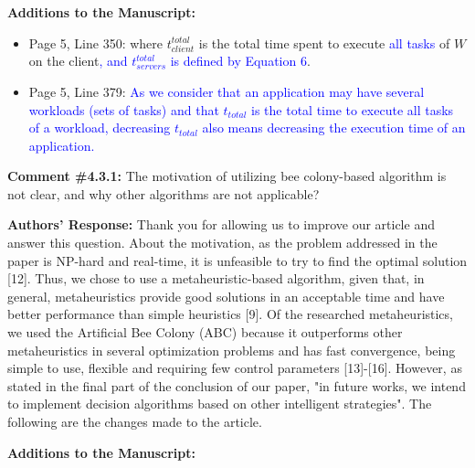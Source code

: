 \textbf{Additions to the Manuscript:}

\begin{itemize}
    \item Page 5, Line 350: where $t^{total}_{client}$ is the total time spent to execute \textcolor{blue}{all tasks} of $W$ on the client\textcolor{blue}{, and $t^{total}_{servers}$ is defined by Equation 6}.
    \item Page 5, Line 379: \textcolor{blue}{As we consider that an application may have several workloads (sets of tasks) and that $t_{total}$ is the total time to execute all tasks of a workload, decreasing $t_{total}$ also means decreasing the execution time of an application.}
\end{itemize}

\vspace{\baselineskip}

\begin{mdframed}[style=review] 
\textbf{Comment \#4.3.1:} The motivation of utilizing bee colony-based algorithm is not clear, and why other algorithms are not applicable?
\end{mdframed}

\textbf{Authors' Response:} Thank you for allowing us to improve our article and answer this question. About the motivation, as the problem addressed in the paper is NP-hard and real-time, it is unfeasible to try to find the optimal solution [12]. Thus, we chose to use a metaheuristic-based algorithm, given that, in general, metaheuristics provide good solutions in an acceptable time and have better performance than simple heuristics [9]. Of the researched metaheuristics, we used the Artificial Bee Colony (ABC) because it outperforms other metaheuristics in several optimization problems and has fast convergence, being simple to use, flexible and requiring few control parameters [13]-[16]. However, as stated in the final part of the conclusion of our paper, "in future works, we intend to implement decision algorithms based on other intelligent strategies". The following are the changes made to the article.

\textbf{Additions to the Manuscript:}

